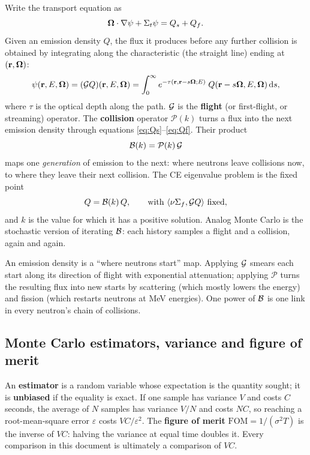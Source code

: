 Write the transport equation as
\begin{equation}
\boldsymbol\Omega\cdot\nabla\psi + \Sigma_t\psi = Q_s + Q_f .
\end{equation}
Given an emission density $Q$, the flux it produces before any further collision is obtained by
integrating along the characteristic (the straight line) ending at $(\mathbf r,\boldsymbol\Omega)$:
\begin{equation}\label{eq:G}
\psi(\mathbf r,E,\boldsymbol\Omega) = (\mathcal G Q)(\mathbf r,E,\boldsymbol\Omega) = \int_0^\infty e^{-\tau(\mathbf r,\mathbf r-s\boldsymbol\Omega;E)}\;Q(\mathbf r-s\boldsymbol\Omega,E,\boldsymbol\Omega)\,\mathrm d s ,
\end{equation}
where $\tau$ is the optical depth along the path. $\mathcal G$ is the \textbf{flight} (or first-flight, or
streaming) operator. The \textbf{collision} operator $\mathcal P(k)$ turns a flux into the next emission
density through equations \eqref{eq:Qs}--\eqref{eq:Qf}. Their product
\begin{equation}
\mathcal B(k)=\mathcal P(k)\,\mathcal G
\end{equation}
maps one \emph{generation} of emission to the next: where neutrons leave collisions now, to where
they leave their next collision. The CE eigenvalue problem is the fixed point
\begin{equation}
Q=\mathcal B(k)\,Q, \qquad \text{with } \langle\nu\Sigma_f,\mathcal G Q\rangle\text{ fixed},
\end{equation}
and $k$ is the value for which it has a positive solution. Analog Monte Carlo is the stochastic
version of iterating $\mathcal B$: each history samples a flight and a collision, again and again.

\begin{intuition}
An emission density is a ``where neutrons start'' map. Applying $\mathcal G$ smears each start along its
direction of flight with exponential attenuation; applying $\mathcal P$ turns the resulting flux
into new starts by scattering (which mostly lowers the energy) and fission (which restarts
neutrons at MeV energies). One power of $\mathcal B$ is one link in every neutron's chain of collisions.
\end{intuition}

\subsection{Monte Carlo estimators, variance and figure of merit}

An \textbf{estimator} is a random variable whose expectation is the quantity sought; it is
\textbf{unbiased} if the equality is exact. If one sample has variance $V$ and costs $C$ seconds, the
average of $N$ samples has variance $V/N$ and costs $NC$, so reaching a root-mean-square error
$\varepsilon$ costs $VC/\varepsilon^2$. The \textbf{figure of merit} $\mathrm{FOM}=1/(\sigma^2T)$ is
the inverse of $VC$: halving the variance at equal time doubles it. Every comparison in this document
is ultimately a comparison of $VC$.

